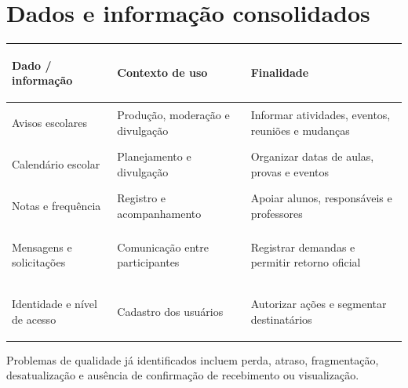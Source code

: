 \section{Dados e informação consolidados}
\begin{table}[!ht]\centering\scriptsize\renewcommand{\arraystretch}{1.4}
\begin{tabularx}{\linewidth}{|>{\bfseries\raggedright\arraybackslash}X|>{\raggedright\arraybackslash}X|>{\raggedright\arraybackslash}X|}
\hline
\textbf{Dado / informação} & \textbf{Contexto de uso} & \textbf{Finalidade} \\
\hline
Avisos escolares & Produção, moderação e divulgação & Informar atividades, eventos, reuniões e mudanças \\
\hline
Calendário escolar & Planejamento e divulgação & Organizar datas de aulas, provas e eventos \\
\hline
Notas e frequência & Registro e acompanhamento & Apoiar alunos, responsáveis e professores \\
\hline
Mensagens e solicitações & Comunicação entre participantes & Registrar demandas e permitir retorno oficial \\
\hline
Identidade e nível de acesso & Cadastro dos usuários & Autorizar ações e segmentar destinatários \\
\hline
\end{tabularx}
\end{table}

Problemas de qualidade já identificados incluem perda, atraso, fragmentação, desatualização e ausência de confirmação de recebimento ou visualização.
